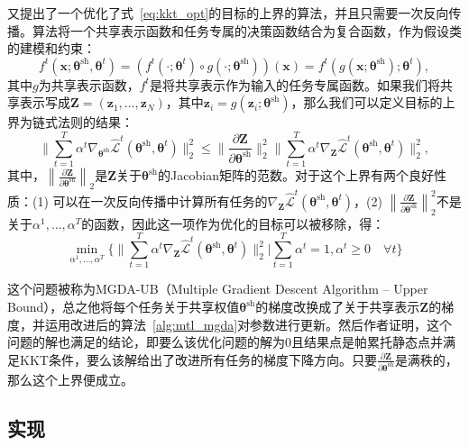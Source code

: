 \documentclass{ctexart}
\begin{document}
\citet{Sener18Pareto}又提出了一个优化了式~\ref{eq:kkt_opt}的目标的上界的算法，并且只需要一次反向传播。算法将一个共享表示函数和任务专属的决策函数结合为复合函数，作为假设类的建模和约束：
\begin{equation}
    f^t(\mathbf{x};\bm\theta^\mathrm{sh},\bm\theta^t) = (f^t(\cdot; \bm\theta^t) \circ g(\cdot; \bm\theta^\mathrm{sh})) (\mathbf{x})  = f^t( g(\mathbf{x}; \bm\theta^\mathrm{sh}); \bm\theta^t),
\end{equation}
其中$g$为共享表示函数，$f^t$是将共享表示作为输入的任务专属函数。如果我们将共享表示写成$\mathbf{Z} = \left(\mathbf{z}_1,\ldots , \mathbf{z}_N\right)$，其中$\mathbf{z}_i = g(\mathbf{z}_i;\bm\theta^\mathrm{sh})$，那么我们可以定义目标的上界为链式法则的结果：
\begin{equation}
    \Bigg\| \sum_{t=1}^T \alpha^t \nabla_{\bm\theta^\mathrm{sh}}  \hat{\mathcal{L}}^t(\bm\theta^\mathrm{sh},\bm\theta^t) \Bigg\|_2^2  \leq    \Bigg\|\frac{\partial \mathbf{Z}}{\partial \bm\theta^\mathrm{sh}}\Bigg\|_2^2 \Bigg\| \sum_{t=1}^T \alpha^t  \nabla_{\mathbf{Z}}  \hat{\mathcal{L}}^t(\bm\theta^\mathrm{sh},\bm\theta^t) \Bigg\|_2^2,
\end{equation}
其中，$\left\|\frac{\partial \mathbf{Z}}{\partial \bm\theta^\mathrm{sh}}\right\|_2$是$\mathbf{Z}$关于$\bm\theta^\mathrm{sh}$的Jacobian矩阵的范数。对于这个上界有两个良好性质：(1) 可以在一次反向传播中计算所有任务的$\nabla_{\mathbf{Z}} \hat{\mathcal{L}}^t(\bm\theta^\mathrm{sh},\bm\theta^t)$，(2) $\left\|\frac{\partial \mathbf{Z}}{\partial \bm\theta^\mathrm{sh}}\right\|_2^2 $不是关于$\alpha^1,\ldots ,\alpha^T$的函数，因此这一项作为优化的目标可以被移除，得：
\begin{equation}
\min_{\alpha^1,\ldots,\alpha^T}  \Bigg\{  \bigg\| \sum_{t=1}^T \alpha^t  \nabla_{\mathbf{Z}}  \hat{\mathcal{L}}^t(\bm\theta^\mathrm{sh},\bm\theta^t) \bigg\|_2^2 \bigg |  \sum_{t=1}^T \alpha^t = 1, \alpha^t \geq 0 \quad \forall t \Bigg\}
\label{eq:approx}
\end{equation}

这个问题被称为MGDA-UB（Multiple Gradient Descent Algorithm -- Upper Bound），总之他将每个任务关于共享权值$\bm\theta^\mathrm{sh}$的梯度改换成了关于共享表示$\mathbf{Z}$的梯度，并运用改进后的算法~\ref{alg:mtl_mgda}对参数进行更新。然后作者证明，这个问题的解也满足\citet{Desideri12MGDA}的结论，即要么该优化问题的解为$0$且结果点是帕累托静态点并满足KKT条件，要么该解给出了改进所有任务的梯度下降方向。只要$\frac{\partial\mathbf{Z}}{\partial\bm\theta^\mathrm{sh}}$是满秩的，那么这个上界便成立。

\subsection{实现}
\end{document}
